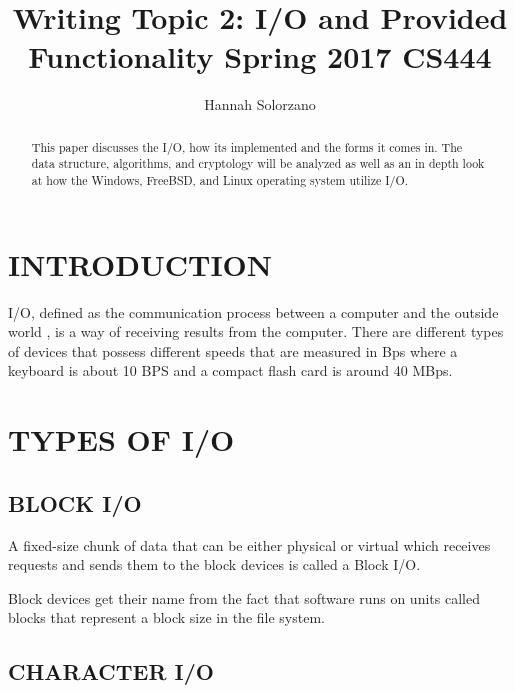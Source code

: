 \documentclass[letterpaper, 10 pt, conference]{ieeeconf}  %
\title{\LARGE \bf
Writing Topic 2: I/O and Provided Functionality\newline
Spring 2017 CS444
}
\author{Hannah Solorzano}
\begin{document}
\maketitle
\thispagestyle{empty}
\pagestyle{empty}


\begin{abstract}

This paper discusses the I/O, how its implemented and the forms it comes in. The data structure, algorithms, and cryptology will be analyzed as well as an in depth look at how the Windows, FreeBSD, and Linux operating system utilize I/O. 

\end{abstract}


\section{INTRODUCTION}

I/O, defined as the communication process between a computer and the outside world \cite{1}, is a way of receiving results from the computer. There are different types of devices that possess different speeds that are measured in Bps where a keyboard is about 10 BPS and a compact flash card is around 40 MBps.\par


\section{TYPES OF I/O}

\subsection{BLOCK I/O}

A fixed-size chunk of data that can be either physical or virtual which receives requests and sends them to the block devices is called a Block I/O.\par
Block devices get their name from the fact that software runs on units called blocks that represent a block size in the file system.
\subsection{CHARACTER I/O}
\end{document}

